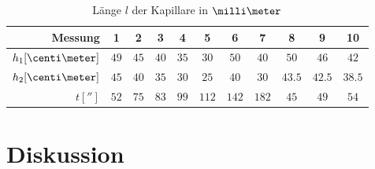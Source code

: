 \documentclass[12pt, a4paper, twoside]{scrartcl}
\begin{document}
\begin{table}
\centering
\begin{tabular}{r|c|c|c|c|c|c|c|c|c|c}
    Messung & 1 & 2 & 3 & 4 & 5 & 6 & 7 & 8 & 9 & 10\\
    \hline
    \hline
    $h_1[\centi\meter]$ & $49$ & $45$ & $40$ & $35$ & $30$ & $50$ & $40$ & $50$ & $46$ & $42$  \\
    \hline
    $h_2[\centi\meter]$ & $45$ & $40$ & $35$ & $30$ & $25$ & $40$ & $30$ & $43.5$ & $42.5$ & $38.5$ \\
    \hline
    $t[\second]$ & $52$ & $75$ & $83$ & $99$ & $112$ & $142$ & $182$ & $45$ & $49$ & $54$ \\
    
 \end{tabular} \label{tab:werte}
 \caption{Länge $l$ der Kapillare in $\milli\meter$}
\end{table}


\section{Diskussion}
\label{sec:diskussion}
\end{document}
